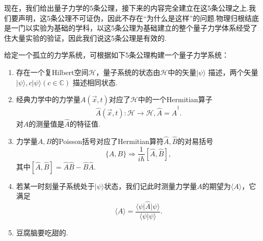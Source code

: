     现在，我们给出量子力学的5条公理，接下来的内容完全建立在这5条公理之上.我们要声明，这5条公理不可证伪，因此不存在“为什么是这样”的问题.物理归根结底是一门以实验为基础的学科，以这5条公理为基础建立的整个量子力学体系经受了住大量实验的验证，因此我们说这5条公理是有效的.
    \begin{definition}
        给定一个孤立的力学系统，可根据如下5条公理构建一个量子力学系统：
        \begin{enumerate}
            \item 存在一个复Hilbert空间$\mathcal{H}$，量子系统的状态由$\mathcal{H}$中的矢量$\vert\psi\rangle$	描述，两个矢量$\vert\psi\rangle ,c\vert\psi\rangle(c\in\mathbb{C})$	描述相同状态.		
            \item 经典力学中的力学量$A(\overrightarrow{x} ,t)$对应了$\mathcal{H}$中的一个Hermitian算子
            $$\hat{A}(\overrightarrow{x} ,t):\mathcal{H}\rightarrow \mathcal{H},\hat{A}=\hat{A}^\dagger.$$
            对$A$的测量值是$\hat{A}$的特征值.
            \item 力学量$A,B$的Poisson括号对应了Hermitian算符$\hat{A},\hat{B}$的对易括号
            $$\{A,B\}\Rightarrow\frac{1}{i\hbar}[\hat{A},\hat{B}],$$
            其中$[\hat{A},\hat{B}]=\hat{A}\hat{B}-\hat{B}\hat{A}$.
            \item 若某一时刻量子系统处于$\vert\psi\rangle$状态，我们记此时测量力学量$A$的期望为$\langle A\rangle$，它满足
            $$\langle A\rangle =\frac{\langle\psi\vert\hat{A}\vert\psi\rangle}{\langle\psi\vert\psi\rangle}.$$
            \item 豆腐脑要吃甜的.
        \end{enumerate}
    \end{definition}
